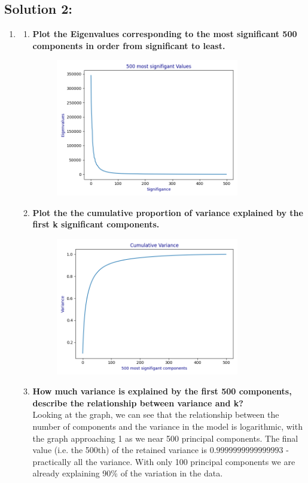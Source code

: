 \documentclass[submit]{harvardml}
\begin{document}
\subsection*{Solution 2:}
\begin{enumerate}
    \item
    \begin{enumerate}
        \item 
        \textbf{Plot the Eigenvalues corresponding to the most significant 500 components in order from significant to least.}
        \begin{figure}[H]
            \includegraphics[width=8cm]{hw5/plots/2_1a.png}
            \centering
        \end{figure}
        
        \item \textbf{Plot the the cumulative proportion of variance explained by the first k significant components.}
        \begin{figure}[H]
            \includegraphics[width=8cm]{hw5/plots/2_1b.png}
            \centering
        \end{figure}
        \item \textbf{How much variance is explained by the first 500 components, describe the relationship between variance and k?}\\
        Looking at the graph, we can see that the relationship between the number of components and the variance in the model is logarithmic, with the graph approaching 1 as we near 500 principal components. The final value (i.e. the 500th) of the retained variance is $0.9999999999999993$ - practically all the variance. With only 100 principal components we are already explaining 90\% of the variation in the data. 
    \end{enumerate}
    

\end{enumerate}
\end{document}
